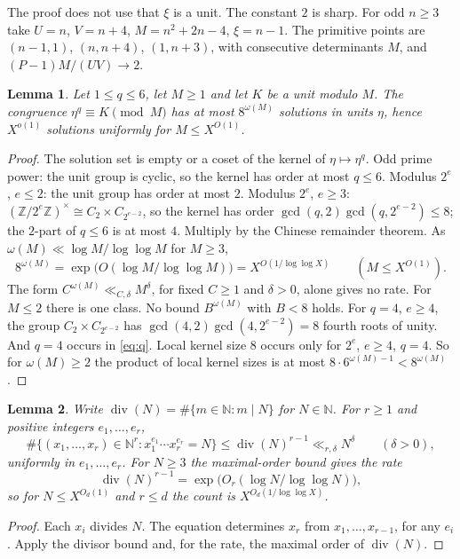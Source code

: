 \documentclass{amsart}
\newtheorem{lemma}{Lemma}[section]
\theoremstyle{definition}
\theoremstyle{plain}
\numberwithin{equation}{section}
\numberwithin{table}{section}
\newcommand{\N}{\mathbb{N}}
\begin{document}
The proof does not use that $\xi$ is a unit. The constant $2$ is sharp. For
odd $n\ge3$ take $U=n$, $V=n+4$, $M=n^2+2n-4$, $\xi=n-1$. The primitive points
are $(n-1,1)$, $(n,n+4)$, $(1,n+3)$, with consecutive determinants $M$, and
$(P-1)M/(UV)\to2$.

\begin{lemma}\label{lem:qroot}
Let $1\le q\le6$, let $M\ge1$ and let $K$ be a unit modulo $M$. The congruence
$\eta^{q}\equiv K\pmod M$ has at most $8^{\omega(M)}$ solutions in units $\eta$,
hence $X^{o(1)}$ solutions uniformly for $M\le X^{O(1)}$.
\end{lemma}

\begin{proof}
The solution set is empty or a coset of the kernel of $\eta\mapsto\eta^q$.
Odd prime power: the unit group is cyclic, so the kernel has order at most
$q\le6$. Modulus $2^e$, $e\le2$: the unit group has order
at most $2$. Modulus $2^e$, $e\ge3$:
$(\mathbb Z/2^e\mathbb Z)^\times\cong C_2\times C_{2^{e-2}}$, so the kernel has
order $\gcd(q,2)\gcd(q,2^{e-2})\le8$; the $2$-part of $q\le6$ is at most
$4$. Multiply by the Chinese remainder theorem. As
$\omega(M)\ll\log M/\log\log M$ for $M\ge3$,
\[
 8^{\omega(M)}=\exp\bigl(O(\log M/\log\log M)\bigr)=X^{O(1/\log\log X)}
 \qquad(M\le X^{O(1)}).
\]
The form $C^{\omega(M)}\ll_{C,\delta}M^{\delta}$, for fixed $C\ge1$ and $\delta>0$, alone gives no rate. For
$M\le2$ there is one class. No bound $B^{\omega(M)}$ with $B<8$ holds. For
$q=4$, $e\ge4$, the group $C_2\times C_{2^{e-2}}$ has
$\gcd(4,2)\gcd(4,2^{e-2})=8$ fourth roots of unity. And $q=4$ occurs in
\eqref{eq:q}. Local kernel size $8$ occurs only for $2^e$, $e\ge4$, $q=4$. So
for $\omega(M)\ge2$ the product of local kernel sizes is at most
$8\cdot6^{\omega(M)-1}<8^{\omega(M)}$.
\end{proof}

\begin{lemma}\label{lem:divisor}
Write $\operatorname{div}(N)=\#\{m\in\N:m\mid N\}$ for $N\in\N$. For
$r\ge1$ and positive integers $e_1,\dots,e_r$,
\[
 \#\{(x_1,\dots,x_r)\in\N^r:x_1^{e_1}\cdots x_r^{e_r}=N\}
 \le \operatorname{div}(N)^{r-1}\ll_{r,\delta}N^{\delta}\qquad(\delta>0),
\]
uniformly in $e_1,\dots,e_r$. For $N\ge3$ the maximal-order bound gives the
rate
\[
 \operatorname{div}(N)^{r-1}=\exp\!\bigl(O_r(\log N/\log\log N)\bigr),
\]
so for $N\le X^{O_d(1)}$ and $r\le d$ the count is $X^{O_d(1/\log\log X)}$.
\end{lemma}

\begin{proof}
Each $x_i$ divides $N$. The equation determines $x_r$ from
$x_1,\dots,x_{r-1}$, for any $e_i$. Apply the divisor bound and, for the rate,
the maximal order of $\operatorname{div}(N)$.
\end{proof}
\end{document}
